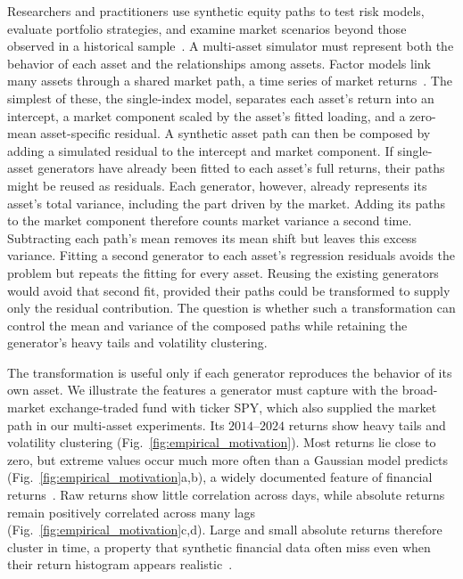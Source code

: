 Researchers and practitioners use synthetic equity paths to test risk
models, evaluate portfolio strategies, and examine market scenarios
beyond those observed in a historical sample~\cite{assefaEtAl2020,
jordonEtAl2022}. A multi-asset simulator must represent both the
behavior of each asset and the relationships among assets. Factor
models link many assets through a shared market path, a time series of
market returns~\cite{sharpe1963, rossAPT1976, famaFrench1993}. The
simplest of these, the single-index model, separates each asset's
return into an intercept, a market component scaled by the asset's
fitted loading, and a zero-mean asset-specific residual. A synthetic
asset path can then be composed by adding a simulated residual to the
intercept and market component. If single-asset generators have
already been fitted to each asset's full returns, their paths might
be reused as residuals. Each generator, however, already represents
its asset's total variance, including the part driven by the market.
Adding its paths to the market component therefore counts market
variance a second time. Subtracting each path's mean removes its mean
shift but leaves this excess variance. Fitting a second generator to
each asset's regression residuals avoids the problem but repeats the
fitting for every asset. Reusing the existing generators would avoid
that second fit, provided their paths could be transformed to supply
only the residual contribution. The question is whether such a
transformation can control the mean and variance of the composed paths
while retaining the generator's heavy tails and volatility clustering.

The transformation is useful only if each generator reproduces the
behavior of its own asset. We illustrate the features a generator must
capture with the broad-market exchange-traded fund with ticker SPY,
which also supplied the market path in our multi-asset experiments.
Its $2014$--$2024$ returns show heavy tails and volatility clustering
(Fig.~\ref{fig:empirical_motivation}). Most returns lie close to zero,
but extreme values occur much more often than a Gaussian model
predicts (Fig.~\ref{fig:empirical_motivation}a,b), a widely documented
feature of financial returns~\cite{mandelbrot1963, cont2001}. Raw
returns show little correlation across days, while absolute returns
remain positively correlated across many lags
(Fig.~\ref{fig:empirical_motivation}c,d). Large and small absolute
returns therefore cluster in time, a property that synthetic
financial data often miss even when their return histogram appears
realistic~\cite{stengerEtAl2024}.

